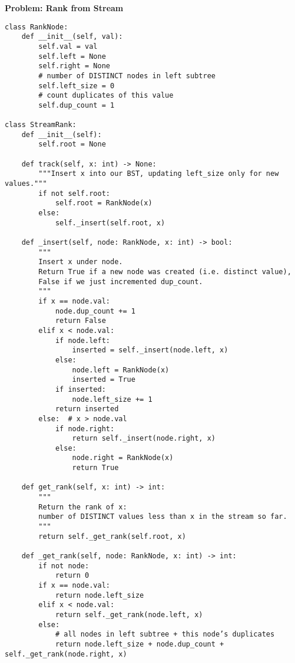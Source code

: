 \noindent\textbf{Problem: Rank from Stream}
\begin{verbatim}
class RankNode:
    def __init__(self, val):
        self.val = val
        self.left = None
        self.right = None
        # number of DISTINCT nodes in left subtree
        self.left_size = 0
        # count duplicates of this value
        self.dup_count = 1

class StreamRank:
    def __init__(self):
        self.root = None

    def track(self, x: int) -> None:
        """Insert x into our BST, updating left_size only for new values."""
        if not self.root:
            self.root = RankNode(x)
        else:
            self._insert(self.root, x)

    def _insert(self, node: RankNode, x: int) -> bool:
        """
        Insert x under node.
        Return True if a new node was created (i.e. distinct value),
        False if we just incremented dup_count.
        """
        if x == node.val:
            node.dup_count += 1
            return False
        elif x < node.val:
            if node.left:
                inserted = self._insert(node.left, x)
            else:
                node.left = RankNode(x)
                inserted = True
            if inserted:
                node.left_size += 1
            return inserted
        else:  # x > node.val
            if node.right:
                return self._insert(node.right, x)
            else:
                node.right = RankNode(x)
                return True

    def get_rank(self, x: int) -> int:
        """
        Return the rank of x:
        number of DISTINCT values less than x in the stream so far.
        """
        return self._get_rank(self.root, x)

    def _get_rank(self, node: RankNode, x: int) -> int:
        if not node:
            return 0
        if x == node.val:
            return node.left_size
        elif x < node.val:
            return self._get_rank(node.left, x)
        else:
            # all nodes in left subtree + this node’s duplicates
            return node.left_size + node.dup_count + self._get_rank(node.right, x)
\end{verbatim}


% 
